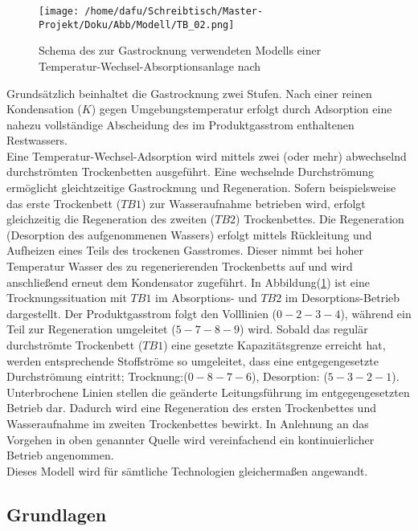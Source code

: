 \documentclass[onecolumn,10pt,titlepage]{article}
\begin{document}
\begin{figure}[H]
	
	\centering

	\texttt{[image: /home/dafu/Schreibtisch/Master-Projekt/Doku/Abb/Modell/TB\_02.png]}
	\caption[Schema: Gastrocknung]{Schema des zur Gastrocknung verwendeten Modells einer Temperatur-Wechsel-Absorptionsanlage nach \cite{Tjarks2017}}
	\label{fig:schema_TB} 
\end{figure}
Grundsätzlich beinhaltet die Gastrocknung zwei Stufen. Nach einer reinen Kondensation ($K$) gegen Umgebungstemperatur erfolgt durch Adsorption eine nahezu vollständige Abscheidung des im Produktgasstrom enthaltenen Restwassers.\\ 
Eine Temperatur-Wechsel-Adsorption wird mittels zwei (oder mehr) abwechselnd durchströmten Trockenbetten ausgeführt. Eine wechselnde Durchströmung ermöglicht gleichtzeitige Gastrocknung und Regeneration. Sofern beispielsweise das erste Trockenbett ($TB1$) zur Wasseraufnahme betrieben wird, erfolgt gleichzeitig die Regeneration des zweiten ($TB2$) Trockenbettes. Die Regeneration (Desorption des aufgenommenen Wassers) erfolgt mittels Rückleitung und Aufheizen eines Teils des trockenen Gasstromes. Dieser nimmt bei hoher Temperatur Wasser des zu regenerierenden Trockenbetts auf und wird anschließend erneut dem Kondensator zugeführt.
In Abbildung(\ref{fig:schema_TB}) ist eine Trocknungssituation mit $TB1$ im Absorptions- und $TB2$ im Desorptions-Betrieb dargestellt. Der Produktgasstrom folgt den Volllinien ($0 -2-3-4$), während ein Teil zur Regeneration  umgeleitet ($5-7-8-9$) wird. Sobald das regulär durchströmte Trockenbett ($TB1$) eine gesetzte Kapazitätsgrenze erreicht hat, werden entsprechende Stoffströme so umgeleitet, dass eine entgegengesetzte Durchströmung eintritt; Trocknung:($0-8-7-6$), Desorption: ($5-3-2-1$). Unterbrochene Linien stellen die geänderte Leitungsführung im entgegengesetzten Betrieb dar. Dadurch wird eine Regeneration des ersten Trockenbettes und Wasseraufnahme im zweiten Trockenbettes bewirkt. 
In Anlehnung an das Vorgehen in oben genannter Quelle wird vereinfachend ein kontinuierlicher Betrieb angenommen.\\
Dieses Modell wird für sämtliche Technologien gleichermaßen angewandt.

\subsection{Grundlagen}
\end{document}

